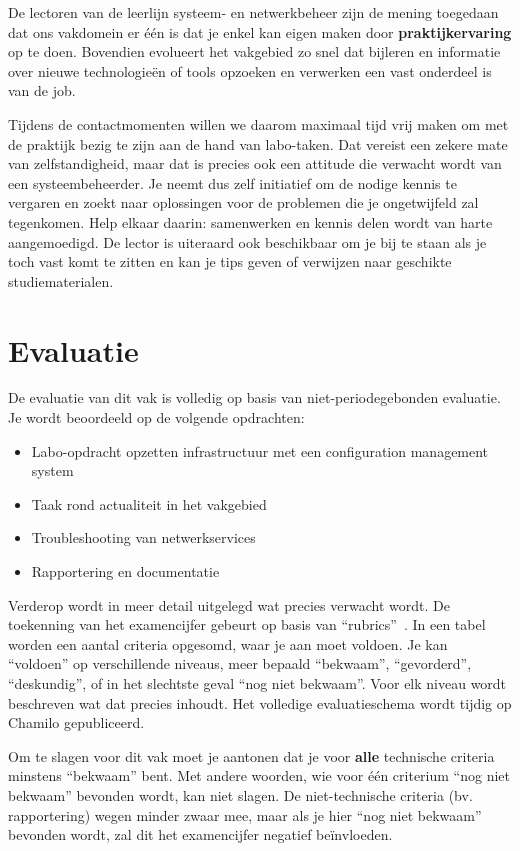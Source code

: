 De lectoren van de leerlijn systeem- en netwerkbeheer zijn de
mening toegedaan dat ons vakdomein er één is dat je enkel kan eigen
maken door \textbf{praktijkervaring} op te doen. Bovendien evolueert het
vakgebied zo snel dat bijleren en informatie over nieuwe
technologieën of tools opzoeken en verwerken een vast onderdeel is van de job.

Tijdens de contactmomenten willen we daarom maximaal tijd vrij maken om
met de praktijk bezig te zijn aan de hand van labo-taken. Dat vereist
een zekere mate van zelfstandigheid, maar dat is precies ook een
attitude die verwacht wordt van een systeembeheerder. Je neemt dus zelf
initiatief om de nodige kennis te vergaren en zoekt naar oplossingen
voor de problemen die je ongetwijfeld zal tegenkomen. Help elkaar
daarin: samenwerken en kennis delen wordt van harte aangemoedigd. De
lector is uiteraard ook beschikbaar om je bij te staan als je toch vast
komt te zitten en kan je tips geven of verwijzen naar geschikte
studiematerialen.

\section{Evaluatie}
\label{evaluatie}

De evaluatie van dit vak is volledig op basis van niet-periodegebonden
evaluatie. Je wordt beoordeeld op de volgende opdrachten:

\begin{itemize}
\item
  Labo-opdracht opzetten infrastructuur met een configuration management
  system
\item
  Taak rond actualiteit in het vakgebied
\item
  Troubleshooting van netwerkservices
\item
  Rapportering en documentatie
\end{itemize}

Verderop wordt in meer detail uitgelegd wat precies verwacht wordt. De
toekenning van het examencijfer gebeurt op basis van ``rubrics''~\autocite{Andrade2000}. In een
tabel worden een aantal criteria opgesomd, waar je aan moet voldoen. Je
kan ``voldoen'' op verschillende niveaus, meer bepaald ``bekwaam'',
``gevorderd'', ``deskundig'', of in het slechtste geval ``nog niet
bekwaam''. Voor elk niveau wordt beschreven wat dat precies inhoudt. Het
volledige evaluatieschema wordt tijdig op Chamilo gepubliceerd.

Om te slagen voor dit vak moet je aantonen dat je voor \textbf{alle} technische
criteria minstens ``bekwaam'' bent. Met andere woorden, wie voor één
criterium ``nog niet bekwaam'' bevonden wordt, kan niet slagen. De
niet-technische criteria (bv. rapportering) wegen minder zwaar mee, maar
als je hier ``nog niet bekwaam'' bevonden wordt, zal dit het
examencijfer negatief beïnvloeden.


